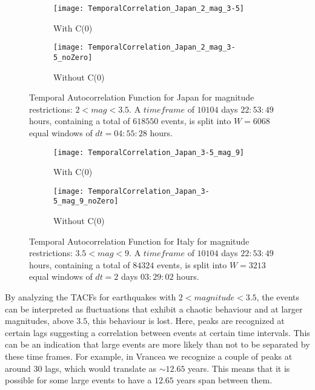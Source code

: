\begin{figure}[!ht]
\begin{subfigure}{.5\textwidth}
  \centering
  \texttt{[image: TemporalCorrelation\_Japan\_2\_mag\_3-5]}
  \caption{With C(0)}
  \label{fig:corrJapan2_3.5}
\end{subfigure}%
\begin{subfigure}{.5\textwidth}
  \centering
  \texttt{[image: TemporalCorrelation\_Japan\_2\_mag\_3-5\_noZero]}
  \caption{Without C(0)}
  \label{fig:corrJapan2_3.5_noZero}
\end{subfigure}
\caption{Temporal Autocorrelation Function for Japan for magnitude restrictions: $2<mag<3.5$. A $timeframe$ of $10104$ days $22:53:49$ hours, containing a total of $618550$ events, is split into $W=6068$ equal windows of $dt=04:55:28$ hours.}
\label{fig:corrJapan2_3.5!}
\end{figure}


\begin{figure}[!ht]
\begin{subfigure}{.5\textwidth}
  \centering
  \texttt{[image: TemporalCorrelation\_Japan\_3-5\_mag\_9]}
  \caption{With C(0)}
  \label{fig:corrJapan3.5_9}
\end{subfigure}%
\begin{subfigure}{.5\textwidth}
  \centering
  \texttt{[image: TemporalCorrelation\_Japan\_3-5\_mag\_9\_noZero]}
  \caption{Without C(0)}
  \label{fig:corrJapan3.5_9_noZero}
\end{subfigure}
\caption{Temporal Autocorrelation Function for Italy for magnitude restrictions: $3.5<mag<9$. A $timeframe$ of $10104$ days $22:53:49$ hours, containing a total of $84324$ events, is split into $W=3213$ equal windows of $dt=2$ days $03:29:02$ hours.}
\label{fig:corrJapan3.5_9!}
\end{figure}

By analyzing the TACFs for earthquakes with $2<magnitude<3.5$, the events can be interpreted as fluctuations that exhibit a chaotic behaviour and at larger magnitudes, above $3.5$, this behaviour is lost. Here, peaks are recognized at certain lags suggesting a correlation between events at certain time intervals. This can be an indication that large events are more likely than not to be separated by these time frames. For example, in Vrancea we recognize a couple of peaks at around $30$ lags, which would translate as $\sim 12.65$ years. This means that it is possible for some large events to have a $12.65$ years span between them.\par 

